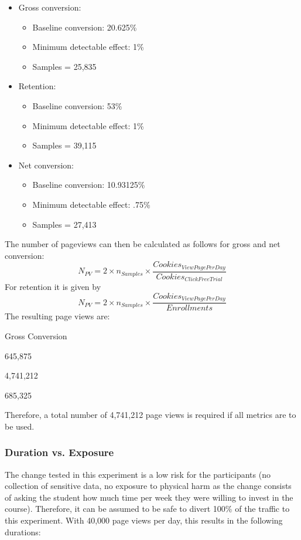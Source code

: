 \documentclass[11pt]{article} %
\begin{document}
\begin{itemize}
\item Gross conversion:
	\begin{itemize}
		\item Baseline conversion: 20.625\%
		\item Minimum detectable effect: 1\%
		\item Samples = 25,835
	\end{itemize}
\item Retention:
	\begin{itemize}
		\item Baseline conversion: 53\%
		\item Minimum detectable effect: 1\%
		\item Samples = 39,115
	\end{itemize}
\item Net conversion:
	\begin{itemize}
		\item Baseline conversion: 10.93125\%
		\item Minimum detectable effect: .75\%
		\item Samples = 27,413
	\end{itemize}
\end{itemize}
The number of pageviews can then be calculated as follows for gross and net conversion:
\begin{equation}
	N_{PV} = 2 \times n_{Samples} \times \frac{Cookies_{ViewPagePerDay}}{Cookies_{ClickFreeTrial}}
\end{equation}
For retention it is given by
\begin{equation}
	N_{PV} = 2 \times n_{Samples} \times \frac{Cookies_{ViewPagePerDay}}{Enrollments}
\end{equation}
The resulting page views are:
\begin{labeling}{Gross Conversion}
\item[Gross Conversion] 645,875
\item[Retention]  4,741,212
\item[Net Conversion]  685,325
\end{labeling}
Therefore, a total number of 4,741,212 page views is required if all metrics are to be used.

\subsubsection{Duration vs. Exposure}

The change tested in this experiment is a low risk for the participants (no collection of sensitive data, no exposure to physical harm as the change consists of asking the student how much time per week they were willing to invest in the course). Therefore, it can be assumed to be safe to divert 100\% of the traffic to this experiment. With 40,000 page views per day, this results in the following durations:
\end{document}
